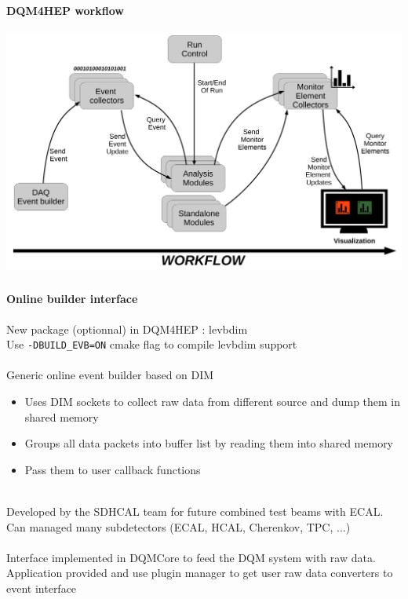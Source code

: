 \documentclass[8pt]{beamer}
\begin{document}
  \begin{frame}
    \frametitle{\secname}
    \framesubtitle{DQM4HEP workflow}
    \begin{center}
      \includegraphics[width=\textwidth]{figs/DQM4HEP_workflow.pdf}
    \end{center}
  \end{frame}



    \begin{frame}[containsverbatim]
    \frametitle{\secname}
    \framesubtitle{Online builder interface}

      New package (optionnal) in DQM4HEP : levbdim \\
      Use \verb|-DBUILD_EVB=ON| cmake flag to compile levbdim support \\
      ~ \\
      Generic online event builder based on DIM
      \begin{itemize}
        \item Uses DIM sockets to collect raw data from different source and dump them in shared memory
        \item Groups all data packets into buffer list by reading them into shared memory
        \item Pass them to user callback functions
      \end{itemize}
      ~ \\
      Developed by the SDHCAL team for future combined test beams with ECAL. \\
      Can managed many subdetectors (ECAL, HCAL, Cherenkov, TPC, ...) \\
      ~ \\
      Interface implemented in DQMCore to feed the DQM system with raw data. \\
      Application provided and use plugin manager to get user raw data converters to event interface

  \end{frame}
\end{document}
